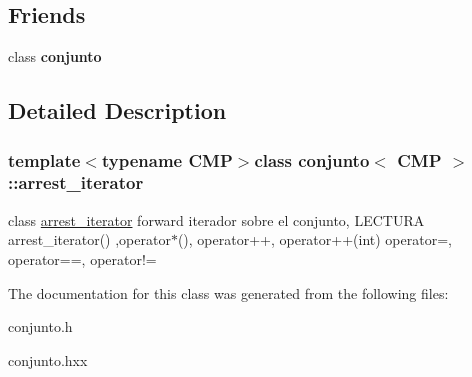 \subsection*{Friends}
\begin{DoxyCompactItemize}
\item 
\hypertarget{classconjunto_1_1arrest__iterator_a42fdcda39c77eabd7380e29fcdbe5dd2}{}class {\bfseries conjunto}\label{classconjunto_1_1arrest__iterator_a42fdcda39c77eabd7380e29fcdbe5dd2}

\end{DoxyCompactItemize}


\subsection{Detailed Description}
\subsubsection*{template$<$typename C\+M\+P$>$class conjunto$<$ C\+M\+P $>$\+::arrest\+\_\+iterator}

class \hyperlink{classconjunto_1_1arrest__iterator}{arrest\+\_\+iterator} forward iterador sobre el conjunto, L\+E\+C\+T\+U\+R\+A arrest\+\_\+iterator() ,operator$\ast$(), operator++, operator++(int) operator=, operator==, operator!= 

The documentation for this class was generated from the following files\+:\begin{DoxyCompactItemize}
\item 
conjunto.\+h\item 
conjunto.\+hxx\end{DoxyCompactItemize}
